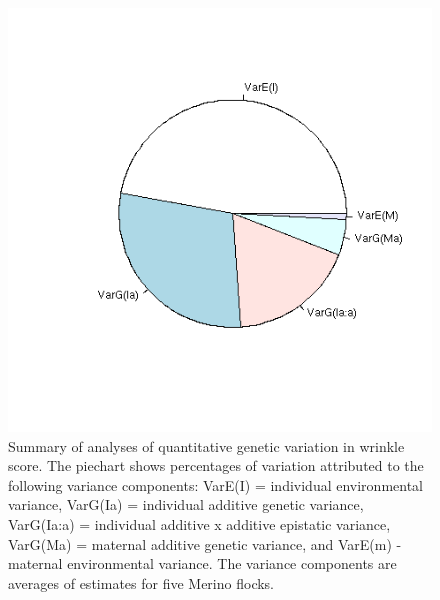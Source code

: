 %

\begin{figure}[!h]
  \centering
  \includegraphics[width=1.0\textwidth]{qgwrinpie.png}
  \caption{Summary of analyses of quantitative genetic variation in wrinkle score. The piechart shows percentages of variation attributed to the following variance components: VarE(I) = individual environmental variance, VarG(Ia) = individual additive genetic variance, VarG(Ia:a) = individual additive x additive epistatic variance, VarG(Ma) = maternal additive genetic variance, and VarE(m) - maternal environmental variance. The variance components are averages of estimates for five Merino flocks.}
  \label{fig:qgwrin}
\end{figure}

%

